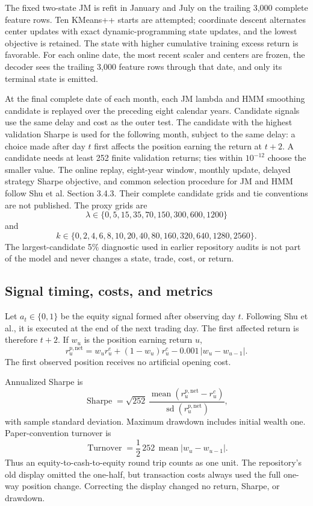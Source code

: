 \documentclass[11pt]{article}
\begin{document}
The fixed two-state JM is refit in January and July on the trailing 3,000
complete feature rows. Ten KMeans++ starts are attempted; coordinate descent
alternates center updates with exact dynamic-programming state updates, and the
lowest objective is retained. The state with higher cumulative training excess
return is favorable. For each online date, the most recent scaler and centers
are frozen, the decoder sees the trailing 3,000 feature rows through that date,
and only its terminal state is emitted.

At the final complete date of each month, each JM lambda and HMM smoothing
candidate is replayed over the preceding eight calendar years. Candidate
signals use the same delay and cost as the outer test. The candidate with the
highest validation Sharpe is used for the following month, subject to the same
delay: a choice made after day \(t\) first affects the position earning the
return at \(t+2\). A candidate needs at least 252 finite validation returns;
ties within \(10^{-12}\) choose the smaller value. The online replay,
eight-year window, monthly update, delayed strategy Sharpe objective, and common
selection procedure for JM and HMM follow Shu et al. Section 3.4.3. Their complete candidate
grids and tie conventions are not published. The proxy grids are
\[
\lambda\in\{0,5,15,35,70,150,300,600,1200\}
\]
and
\[
k\in\{0,2,4,6,8,10,20,40,80,160,320,640,1280,2560\}.
\]
The largest-candidate 5\% diagnostic used in earlier repository audits is not
part of the model and never changes a state, trade, cost, or return.

\subsection{Signal timing, costs, and metrics}

Let \(a_t\in\{0,1\}\) be the equity signal formed after observing day \(t\).
Following Shu et al., it is executed at the end of the next trading day. The
first affected return is therefore \(t+2\). If \(w_u\) is the position earning
return \(u\),
\begin{equation}
r^{p,\mathrm{net}}_u
=w_u r^e_u+(1-w_u)r^c_u
-0.001\,|w_u-w_{u-1}|.
\label{eq:net}
\end{equation}
The first observed position receives no artificial opening cost.

Annualized Sharpe is
\begin{equation}
\operatorname{Sharpe}
=\sqrt{252}\,
\frac{\operatorname{mean}(r^{p,\mathrm{net}}_u-r^c_u)}
     {\operatorname{sd}(r^{p,\mathrm{net}}_u)},
\label{eq:sharpe}
\end{equation}
with sample standard deviation. Maximum drawdown includes initial wealth one.
Paper-convention turnover is
\begin{equation}
\operatorname{Turnover}
=\frac12\,252\,\operatorname{mean}|w_u-w_{u-1}|.
\label{eq:turnover}
\end{equation}
Thus an equity-to-cash-to-equity round trip counts as one unit. The repository's
old display omitted the one-half, but transaction costs always used the full
one-way position change. Correcting the display changed no return, Sharpe, or
drawdown.
\end{document}
